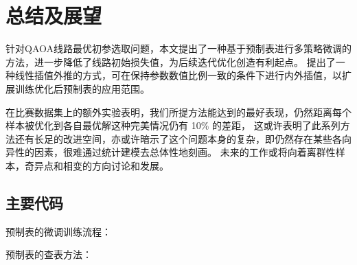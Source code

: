 \documentclass[withoutpreface,bwprint]{cumcmthesis}
\begin{document}
\section{总结及展望}

针对QAOA线路最优初参选取问题，本文提出了一种基于预制表进行多策略微调的方法，进一步降低了线路初始损失值，为后续迭代优化创造有利起点。
提出了一种线性插值外推的方式，可在保持参数数值比例一致的条件下进行内外插值，以扩展训练优化后预制表的应用范围。

在比赛数据集上的额外实验表明，我们所提方法能达到的最好表现，仍然距离每个样本被优化到各自最优解这种完美情况仍有 10\% 的差距，
这或许表明了此系列方法还有长足的改进空间，亦或许暗示了这个问题本身的复杂，即仍然存在某些各向异性的因素，很难通过统计建模去总体性地刻画。
未来的工作或将向着离群性样本，奇异点和相变的方向讨论和发展。


\nocite{*}


\newpage
\begin{appendices}

\section{主要代码}

预制表的微调训练流程：



预制表的查表方法：



\end{appendices}
\end{document}
